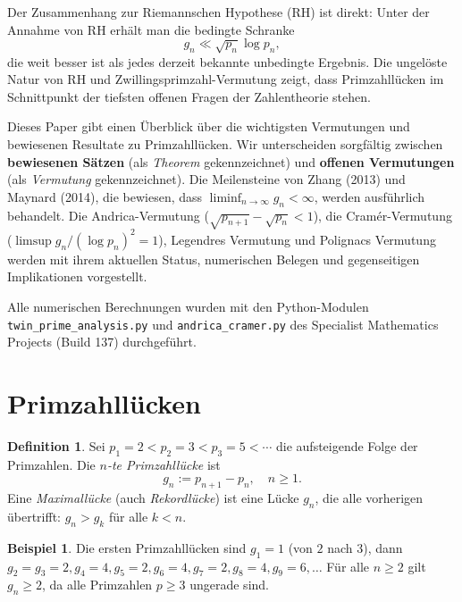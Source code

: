 \documentclass[12pt,a4paper]{amsart}
\theoremstyle{definition}
\newtheorem{definition}[theorem]{Definition}
\newtheorem{beispiel}[theorem]{Beispiel}
\begin{document}
Der Zusammenhang zur Riemannschen Hypothese (RH) ist direkt: Unter der Annahme
von RH erh\"{a}lt man die bedingte Schranke
\[
  g_n \ll \sqrt{p_n} \log p_n,
\]
die weit besser ist als jedes derzeit bekannte unbedingte Ergebnis. Die
ungel\"{o}ste Natur von RH und Zwillingsprimzahl-Vermutung zeigt, dass
Primzahll\"{u}cken im Schnittpunkt der tiefsten offenen Fragen der Zahlentheorie
stehen.

Dieses Paper gibt einen \"{U}berblick \"{u}ber die wichtigsten Vermutungen und
bewiesenen Resultate zu Primzahll\"{u}cken. Wir unterscheiden sorgf\"{a}ltig zwischen
\textbf{bewiesenen S\"{a}tzen} (als \emph{Theorem} gekennzeichnet) und
\textbf{offenen Vermutungen} (als \emph{Vermutung} gekennzeichnet). Die
Meilensteine von Zhang (2013) und Maynard (2014), die bewiesen, dass
$\liminf_{n\to\infty} g_n < \infty$, werden ausf\"{u}hrlich behandelt. Die
Andrica-Vermutung ($\sqrt{p_{n+1}} - \sqrt{p_n} < 1$), die Cram\'{e}r-Vermutung
($\limsup g_n / (\log p_n)^2 = 1$), Legendres Vermutung und Polignacs Vermutung
werden mit ihrem aktuellen Status, numerischen Belegen und gegenseitigen
Implikationen vorgestellt.

Alle numerischen Berechnungen wurden mit den Python-Modulen
\texttt{twin\_prime\_analysis.py} und \texttt{andrica\_cramer.py} des
Specialist Mathematics Projects (Build 137) durchgef\"{u}hrt.

\section{Primzahll\"{u}cken}

\begin{definition}
Sei $p_1 = 2 < p_2 = 3 < p_3 = 5 < \cdots$ die aufsteigende Folge der
Primzahlen. Die \emph{$n$-te Primzahll\"{u}cke} ist
\[
  g_n := p_{n+1} - p_n, \quad n \geq 1.
\]
Eine \emph{Maximall\"{u}cke} (auch \emph{Rekordl\"{u}cke}) ist eine L\"{u}cke $g_n$,
die alle vorherigen \"{u}bertrifft: $g_n > g_k$ f\"{u}r alle $k < n$.
\end{definition}

\begin{beispiel}
Die ersten Primzahll\"{u}cken sind $g_1 = 1$ (von $2$ nach $3$), dann
$g_2 = g_3 = 2, g_4 = 4, g_5 = 2, g_6 = 4, g_7 = 2, g_8 = 4, g_9 = 6,
\ldots$ F\"{u}r alle $n \geq 2$ gilt $g_n \geq 2$, da alle Primzahlen $p \geq 3$
ungerade sind.
\end{beispiel}
\end{document}
